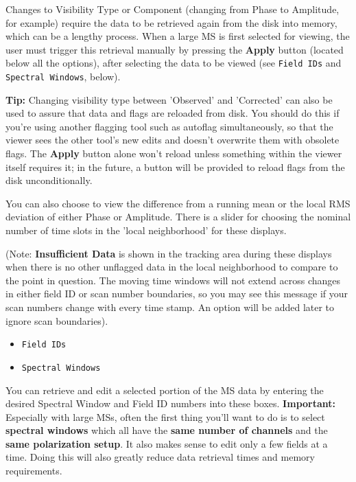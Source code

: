 Changes to Visibility Type or Component (changing from Phase to
Amplitude, for example) require the data to be retrieved again
from the disk into memory, which can be a lengthy process.  When a
large MS is first selected for viewing, the user must
trigger this retrieval manually by pressing the {\bf Apply} button
(located below all the options), after selecting the data to be
viewed (see {\tt Field IDs} and {\tt Spectral Windows}, below).

{\bf Tip:} Changing visibility type between 'Observed' and 'Corrected' can
also be used to assure that data and flags are reloaded from disk.  You
should do this if you're using another flagging tool such as autoflag
simultaneously, so that the viewer sees the other tool's new edits
and doesn't overwrite them with obsolete flags.  The {\bf Apply} button 
alone won't reload unless something within the viewer itself requires
it; in the future, a button will be provided to reload flags from the disk
unconditionally.  

You can also choose to view the difference from a running mean or the
local RMS deviation of either Phase or Amplitude.  There is a slider
for choosing the nominal number of time slots in the 'local neighborhood'
for these displays.

(Note: {\bf Insufficient Data} is shown in the tracking area during
these displays when there is no other unflagged data in the
local neighborhood to compare to the point in question.  The
moving time windows will not extend across changes in either field ID
or scan number boundaries, so you may see this message if your scan
numbers change with every time stamp.  An option will be added later
to ignore scan boundaries).

\begin{itemize}

\item {\tt Field IDs}

\item {\tt Spectral Windows}

\end{itemize}

You can retrieve and edit a selected portion of the MS data
by entering the desired Spectral Window and Field ID numbers into
these boxes.  {\bf Important:} Especially with large MSs, often the
first thing you'll want to do is to select {\bf spectral windows}
which all have the {\bf same number of channels} and the
{\bf same polarization setup}.  It also makes sense to edit only
a few fields at a time.   Doing this will also
greatly reduce data retrieval times and memory requirements.

